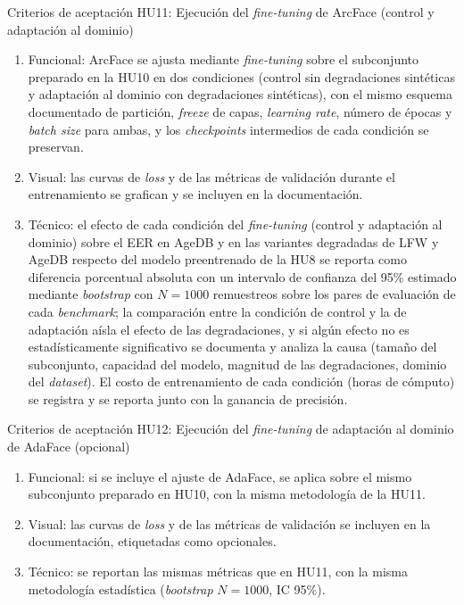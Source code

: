\documentclass[
  11pt, %
]{charter}
\begin{document}
Criterios de aceptación HU11: Ejecución del \textit{fine-tuning} de ArcFace (control y adaptación al dominio)
\begin{enumerate}
  \item Funcional: ArcFace se ajusta mediante \textit{fine-tuning} sobre el subconjunto preparado en la HU10 en dos condiciones (control sin degradaciones sintéticas y adaptación al dominio con degradaciones sintéticas), con el mismo esquema documentado de partición, \textit{freeze} de capas, \textit{learning rate}, número de épocas y \textit{batch size} para ambas, y los \textit{checkpoints} intermedios de cada condición se preservan.
  \item Visual: las curvas de \textit{loss} y de las métricas de validación durante el entrenamiento se grafican y se incluyen en la documentación.
  \item Técnico: el efecto de cada condición del \textit{fine-tuning} (control y adaptación al dominio) sobre el EER en AgeDB y en las variantes degradadas de LFW y AgeDB respecto del modelo preentrenado de la HU8 se reporta como diferencia porcentual absoluta con un intervalo de confianza del 95\% estimado mediante \textit{bootstrap} con $N=1000$ remuestreos sobre los pares de evaluación de cada \textit{benchmark}; la comparación entre la condición de control y la de adaptación aísla el efecto de las degradaciones, y si algún efecto no es estadísticamente significativo se documenta y analiza la causa (tamaño del subconjunto, capacidad del modelo, magnitud de las degradaciones, dominio del \textit{dataset}). El costo de entrenamiento de cada condición (horas de cómputo) se registra y se reporta junto con la ganancia de precisión.
\end{enumerate}

Criterios de aceptación HU12: Ejecución del \textit{fine-tuning} de adaptación al dominio de AdaFace (opcional)
\begin{enumerate}
  \item Funcional: si se incluye el ajuste de AdaFace, se aplica sobre el mismo subconjunto preparado en HU10, con la misma metodología de la HU11.
  \item Visual: las curvas de \textit{loss} y de las métricas de validación se incluyen en la documentación, etiquetadas como opcionales.
  \item Técnico: se reportan las mismas métricas que en HU11, con la misma metodología estadística (\textit{bootstrap} $N=1000$, IC 95\%).
\end{enumerate}
\end{document}
